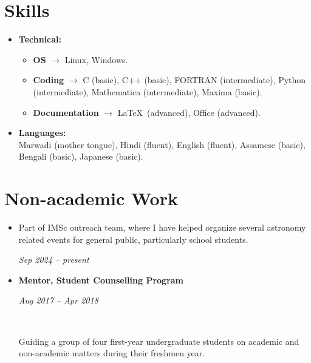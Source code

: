 \documentclass[11pt, letterpaper]{article}
\newcommand{\entry}[4]{
	\ifthenelse{\isempty{#3}}
	{\slimentry{#1}{#2}}{
		\begin{minipage}[t]{.25\linewidth}
			\hfill #1
		\end{minipage}
		\hfill \vline \hfill
		\begin{minipage}[t]{.7\linewidth}
			{\bf #2} \\ #3 \\ \footnotesize{#4}
		\end{minipage}\\
		\vspace{.2cm}
}}
\newcommand{\slimentry}[2]{
	\begin{minipage}[t]{.25\linewidth}
		\hfill \textsc{#1}
	\end{minipage}
	\hfill \vline \hfill
	\begin{minipage}[t]{.7\linewidth}
		#2
	\end{minipage}\\
	\vspace{.25cm}
}%
\newcommand{\colentry}[2]{
	\begin{minipage}[t]{.75\linewidth}
		#1
	\end{minipage}
	\hfill
	\begin{minipage}[t]{.22\linewidth}
		\hfill #2
	\end{minipage}
}%
\begin{document}
	\section{Skills}
	\begin{itemize}[nolistsep]
		\item \textbf{Technical:}
		\begin{itemize}
			\item \textbf{OS} $\rightarrow$ Linux, Windows.
			\item \textbf{Coding} $\rightarrow$ C (basic), C++ (basic), FORTRAN (intermediate), Python (intermediate), Mathematica (intermediate), Maxima (basic).
			\item \textbf{Documentation} $\rightarrow$ \LaTeX\ (advanced), Office (advanced).
		\end{itemize}
		
		\item \textbf{Languages:} \\
		Marwadi (mother tongue), Hindi (fluent), English (fluent), Assamese (basic), Bengali (basic), Japanese (basic).
	\end{itemize}
	
	\section{Non-academic Work}
	\begin{itemize}
		\item \colentry{Part of IMSc outreach team, where I have helped organize several astronomy related events for general public, particularly school students.}{\textit{Sep 2024 -- present}}
		
		\item \colentry{\textbf{Mentor, Student Counselling Program}}{\textit{Aug 2017 -- Apr 2018}} \\ \colentry{Guiding a group of four first-year undergraduate students on academic and non-academic matters during their freshmen year.}{}
	\end{itemize}
\end{document}
